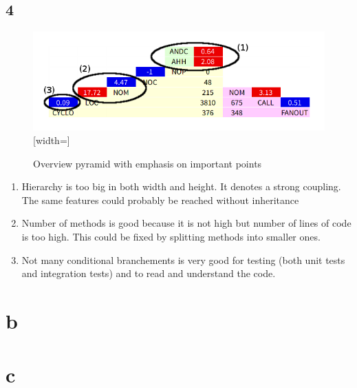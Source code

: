 \subsection{4}

\begin{figure}[h]
    \includegraphics{OverviewPyramid_annotated.png}[width=\textwidth]
    \caption{\label{fig:pyramid}Overview pyramid with emphasis on important points}
\end{figure}

\begin{enumerate}
    \item Hierarchy is too big in both width and height. It denotes a strong coupling. The same features could probably be reached without inheritance
    \item Number of methods is good because it is not high but number of lines of code is too high. This could be fixed by splitting methods into smaller ones.
    \item Not many conditional branchements is very good for testing (both unit tests and integration tests) and to read and understand the code.
\end{enumerate}

\section{b}

\section{c}
